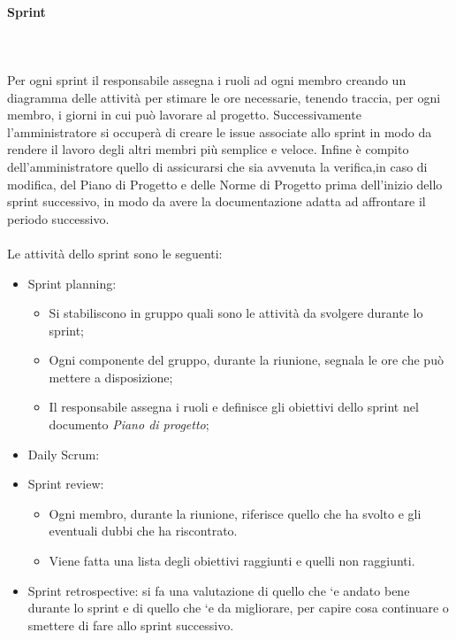             \paragraph*{Sprint} ~\\\\
            Per ogni sprint il responsabile assegna i ruoli ad ogni membro creando un diagramma delle attività per stimare le ore necessarie, tenendo traccia, per ogni membro, i giorni
            in cui può lavorare al progetto. Successivamente l'amministratore si occuperà di creare le issue associate allo sprint in modo da rendere il lavoro degli altri membri più semplice e veloce.
            Infine è compito dell'amministratore quello di assicurarsi che sia avvenuta la verifica,in caso di modifica, del Piano
            di Progetto e delle Norme di Progetto prima dell'inizio dello sprint successivo, in modo da avere la
            documentazione adatta ad affrontare il periodo successivo.\\\\
            Le attività dello sprint sono le seguenti:
            \begin{itemize}
                \item Sprint planning:
                \begin{itemize}
                    \item Si stabiliscono in gruppo quali sono le attività da svolgere durante lo sprint;
                    \item Ogni componente del gruppo, durante la riunione, segnala le ore che può mettere a disposizione;
                    \item Il responsabile assegna i ruoli e definisce gli obiettivi dello sprint nel documento \textit{Piano di progetto};
                \end{itemize}
                \item Daily Scrum:
                \item Sprint review:
                \begin{itemize}
                    \item Ogni membro, durante la riunione, riferisce quello che ha svolto e gli eventuali dubbi che ha riscontrato.
                    \item Viene fatta una lista degli obiettivi raggiunti e quelli non raggiunti.
                \end{itemize}
                \item Sprint retrospective: si fa una valutazione di quello che `e andato bene durante lo sprint e di
                quello che `e da migliorare, per capire cosa continuare o smettere di fare allo sprint successivo.
            \end{itemize}
